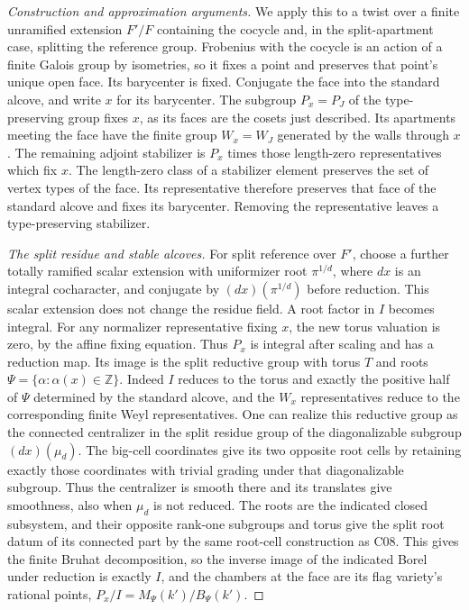 \documentclass[11pt,a4paper,openany,oneside]{book}
\theoremstyle{resultstyle}
\theoremstyle{definition}
\numberwithin{equation}{chapter}
\begin{document}
\begin{proof}[Construction and approximation arguments]
We apply this to a twist over a finite unramified extension
\(F'/F\) containing the cocycle and, in the split-apartment
case, splitting the reference group. Frobenius with the
cocycle is an action of a finite Galois group by isometries,
so it fixes a point and preserves that point's unique open
face. Its barycenter is fixed. Conjugate the face into the
standard alcove, and write \(x\) for its barycenter.
The subgroup \(P_x=P_J\) of the type-preserving group fixes
\(x\), as its faces are the cosets just described. Its
apartments meeting the face have the finite group \(W_x=W_J\)
generated by the walls through \(x\).
The remaining adjoint stabilizer is \(P_x\) times those
length-zero representatives which fix \(x\). The length-zero
class of a stabilizer element preserves the set of vertex
types of the face. Its representative therefore preserves
that face of the standard alcove and fixes its barycenter.
Removing the representative leaves a type-preserving
stabilizer.

\medskip\noindent
\textit{The split residue and stable alcoves.}
For split reference over \(F'\), choose a further totally
ramified scalar extension with uniformizer root
\(\pi^{1/d}\), where \(d x\) is an integral cocharacter,
and conjugate by \((d x)(\pi^{1/d})\) before reduction.
This scalar extension does not change the residue field.
A root factor in \(I\) becomes integral. For any normalizer
representative fixing \(x\), the new torus valuation is zero,
by the affine fixing equation. Thus \(P_x\) is integral after
scaling and has a reduction map. Its image is the split
reductive group with torus \(T\) and roots
\(\Psi=\{\alpha:\alpha(x)\in\mathbb Z\}\).
Indeed \(I\) reduces to the torus and exactly the positive
half of \(\Psi\) determined by the standard alcove, and the
\(W_x\) representatives reduce to the corresponding finite
Weyl representatives. One can realize this reductive group
as the connected centralizer in the split residue group of
the diagonalizable subgroup \((d x)(\mu_d)\). The big-cell
coordinates give its two opposite root cells by retaining
exactly those coordinates with trivial grading under that
diagonalizable subgroup. Thus the centralizer is smooth
there and its translates give smoothness, also when
\(\mu_d\) is not reduced. The roots are the indicated closed
subsystem, and their opposite rank-one subgroups and torus
give the split root datum of its connected part by the same
root-cell construction as C08. This gives the finite Bruhat
decomposition, so the inverse image of the indicated
Borel under reduction is exactly \(I\), and the chambers
at the face are its flag variety's rational points,
\(P_x/I=M_\Psi(k')/B_\Psi(k')\).


\end{proof}
\end{document}
